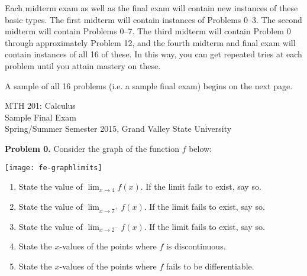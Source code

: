 \documentclass[addpoints]{exam}
\begin{document}
Each midterm exam as well as the final exam will contain new instances of these basic types. The first midterm will contain instances of Problems 0--3. The second midterm will contain Problems 0--7. The third midterm will contain Problem 0 through approximately Problem 12, and the fourth midterm and final exam will contain instances of all 16 of these. In this way, you can get repeated tries at each problem until you attain mastery on these. 

\medskip

A sample of all 16 problems (i.e. a sample final exam) begins on the next page.

\newpage

\begin{center}
	\begin{large}
		MTH 201: Calculus \\
		Sample Final Exam \\
		Spring/Summer Semester 2015, Grand Valley State University
	\end{large}
\end{center}

\noindent
\textbf{Problem 0.} Consider the graph of the function $f$ below: 
\begin{center}
	\texttt{[image: fe-graphlimits]}
\end{center}
	\begin{enumerate}
		\item State the value of $\displaystyle{\lim_{x \to 4} f(x)}$. If the limit fails to exist, say so. 
		\item State the value of $\displaystyle{\lim_{x \to 7^+} f(x)}$. If the limit fails to exist, say so. 		

		\item State the value of $\displaystyle{\lim_{x \to 2^-} f(x)}$. If the limit fails to exist, say so. 
		
		\item State the $x$-values of the points where $f$ is discontinuous. 
		
		
		\item State the $x$-values of the points where $f$ fails to be differentiable. 

			
	\end{enumerate}

\vspace{0.3in}
\end{document}
